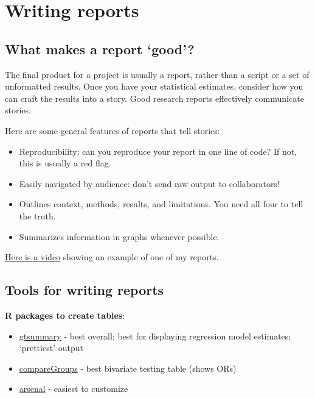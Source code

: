 \documentclass[
]{book}
\begin{document}
\hypertarget{writing-reports}{%
\chapter{Writing reports}\label{writing-reports}}

\hypertarget{what-makes-a-report-good}{%
\section{What makes a report `good'?}\label{what-makes-a-report-good}}

The final product for a project is usually a report, rather than a script or a set of unformatted results. Once you have your statistical estimates, consider how you can craft the results into a story. Good research reports effectively communicate stories.

Here are some general features of reports that tell stories:

\begin{itemize}
\item
  Reproducibility: can you reproduce your report in one line of code? If not, this is usually a red flag.
\item
  Easily navigated by audience: don't send raw output to collaborators!
\item
  Outlines context, methods, results, and limitations. You need all four to tell the truth.
\item
  Summarizes information in graphs whenever possible.
\end{itemize}

\href{https://youtu.be/Bs6EYlw6di0}{Here is a video} showing an example of one of my reports.

\hypertarget{tables}{%
\section{Tools for writing reports}\label{tables}}

\textbf{R packages to create tables}:

\begin{itemize}
\item
  \href{https://www.danieldsjoberg.com/gtsummary/}{gtsummary} - best overall; best for displaying regression model estimates; `prettiest' output
\item
  \href{https://cran.r-project.org/web/packages/compareGroups/vignettes/compareGroups_vignette.html}{compareGroups} - best bivariate testing table (shows ORs)
\item
  \href{https://cran.r-project.org/web/packages/arsenal/vignettes/tableby.html}{arsenal} - easiest to customize
\end{itemize}
\end{document}
